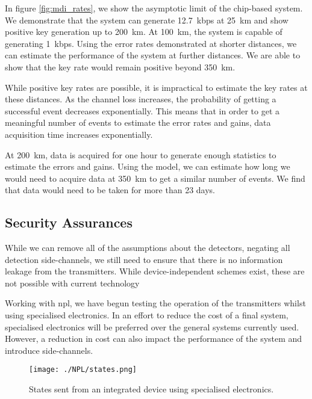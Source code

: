 In figure \ref{fig:mdi_rates}, we show the asymptotic limit of the chip-based system. We demonstrate that the system can generate \SI{12.7}{kbps} at \SI{25}{\km} and show positive key generation up to \SI{200}{\km}. At \SI{100}{\km}, the system is capable of generating \SI{1}{kbps}. Using the error rates demonstrated at shorter distances, we can estimate the performance of the system at further distances. We are able to show that the key rate would remain positive beyond \SI{350}{\km}.

While positive key rates are possible, it is impractical to estimate the key rates at these distances. As the channel loss increases, the probability of getting a successful event decreases exponentially. This means that in order to get a meaningful number of events to estimate the error rates and gains, data acquisition time increases exponentially. 

At \SI{200}{\km}, data is acquired for one hour to generate enough statistics to estimate the errors and gains. Using the model, we can estimate how long we would need to acquire data at \SI{350}{\km} to get a similar number of events. We find that data would need to be taken for more than 23 days. 

%

\subsection{Security Assurances}

While we can remove all of the assumptions about the detectors, negating all detection side-channels, we still need to ensure that there is no information leakage from the transmitters. While device-independent schemes exist, these are not possible with current technology

Working with \ac{npl}, we have begun testing the operation of the transmitters whilst using specialised electronics. In an effort to reduce the cost of a final system, specialised electronics will be preferred over the general systems currently used. However, a reduction in cost can also impact the performance of the system and introduce side-channels.

\begin{figure}
	\texttt{[image: ./NPL/states.png]}
	\caption{States sent from an integrated device using specialised electronics.}
	\label{fig:npl_states}
\end{figure}

